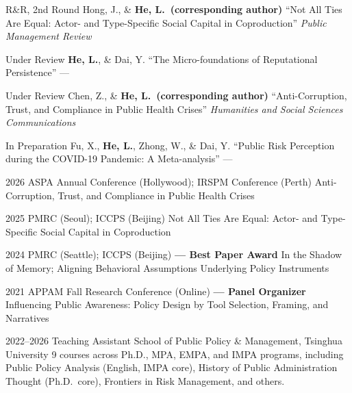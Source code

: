 \documentclass[11pt, a4paper]{awesome-cv}
\begin{document}
\cventry
  {R\&R, 2nd Round}
  {Hong, J., \& \textbf{He, L.\ (corresponding author)}}
  {``Not All Ties Are Equal: Actor- and Type-Specific Social Capital in Coproduction''}
  {\textit{Public Management Review}}
  {}
  {}

\cventry
  {Under Review}
  {\textbf{He, L.}, \& Dai, Y.}
  {``The Micro-foundations of Reputational Persistence''}
  {---}
  {}
  {}

\cventry
  {Under Review}
  {Chen, Z., \& \textbf{He, L.\ (corresponding author)}}
  {``Anti-Corruption, Trust, and Compliance in Public Health Crises''}
  {\textit{Humanities and Social Sciences Communications}}
  {}
  {}

\cventry
  {In Preparation}
  {Fu, X., \textbf{He, L.}, Zhong, W., \& Dai, Y.}
  {``Public Risk Perception during the COVID-19 Pandemic: A Meta-analysis''}
  {---}
  {}
  {}



\cventry
  {2026}
  {ASPA Annual Conference (Hollywood); IRSPM Conference (Perth)}
  {Anti-Corruption, Trust, and Compliance in Public Health Crises}
  {}
  {}
  {}

\cventry
  {2025}
  {PMRC (Seoul); ICCPS (Beijing)}
  {Not All Ties Are Equal: Actor- and Type-Specific Social Capital in Coproduction}
  {}
  {}
  {}

\cventry
  {2024}
  {PMRC (Seattle); ICCPS (Beijing) \textbf{--- Best Paper Award}}
  {In the Shadow of Memory; Aligning Behavioral Assumptions Underlying Policy Instruments}
  {}
  {}
  {}

\cventry
  {2021}
  {APPAM Fall Research Conference (Online) \textbf{--- Panel Organizer}}
  {Influencing Public Awareness: Policy Design by Tool Selection, Framing, and Narratives}
  {}
  {}
  {}



\cventry
  {2022--2026}
  {Teaching Assistant}
  {School of Public Policy \& Management, Tsinghua University}
  {}
  {}
  {
    9 courses across Ph.D., MPA, EMPA, and IMPA programs, including Public Policy Analysis (English, IMPA core), History of Public Administration Thought (Ph.D.\ core), Frontiers in Risk Management, and others.
  }

\end{document}
